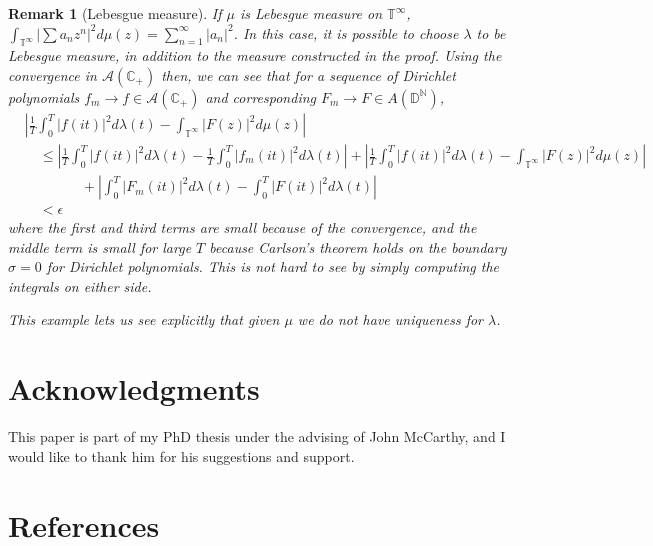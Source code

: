\documentclass[]{elsarticle}
\newcommand{\N}{\mathbb{N}}
\newcommand{\T}{\mathbb{T}}
\newcommand{\D}{\mathbb{D}}
\newcommand{\cA}{\mathcal{A}}
\newcommand{\cplus}{\mathbb{C}_{+}}
\numberwithin{equation}{section}
\newtheorem{remark}[prop]{Remark}
\begin{document}
  \begin{remark}[Lebesgue measure]
  \label{subthe_case_of_lebesgue_measure}
    If $\mu$ is Lebesgue measure on $\T^\infty$, $\int_{\T^{\infty}} \left| \sum a_n z^{n} \right|^2 d\mu(z)=\sum_{n=1}^\infty |a_n|^2$. In this case, it is possible to choose $\lambda$ to be Lebesgue measure, in addition to the measure constructed in the proof. Using the convergence in $\cA(\cplus)$ then, we can see that for a sequence of Dirichlet polynomials $f_m\to f\in \cA(\cplus)$ and corresponding $F_m \to F\in A(\D^{\N})$,
    \begin{align*}
      &\left|\frac{1}{T} \int_{0}^{T}\left|f(it)\right|^2 d\lambda(t) -\int_{\T^{\infty}} \left|F(z)\right|^2 d\mu(z)\right|\\
        &\quad\leq \left|\frac{1}{T} \int_{0}^{T}\left|f(it)\right|^2 d\lambda(t) -\frac{1}{T} \int_{0}^{T}\left|f_m(it)\right|^2 d\lambda(t)\right|
          +\left|\frac{1}{T} \int_{0}^{T}\left|f(it)\right|^2 d\lambda(t) -\int_{\T^{\infty}} \left|F(z)\right|^2 d\mu(z)\right|\\
          &\qquad\qquad+\left|\int_{0}^{T}\left|F_m(it)\right|^2 d\lambda(t) - \int_{0}^{T}\left|F(it)\right|^2 d\lambda(t)\right|\\
        &\quad<\epsilon
    \end{align*}
    where the first and third terms are small because of the convergence, and the middle term is small for large $T$ because Carlson's theorem holds on the boundary $\sigma=0$ for Dirichlet polynomials. This is not hard to see by simply computing the integrals on either side.

    This example lets us see explicitly that given $\mu$ we do not have uniqueness for $\lambda$.
  \end{remark} %
    

\section*{Acknowledgments}
  This paper is part of my PhD thesis under the advising of John McCarthy, and I would like to thank him for his suggestions and support.


\section*{References}

\end{document}
